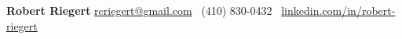 \textbf{Robert Riegert}
\hfill
\href{mailto:rcriegert@gmail.com}{rcriegert@gmail.com} \textbar\ (410) 830-0432 \textbar\ \href{https://www.linkedin.com/in/robert-riegert/}{linkedin.com/in/robert-riegert}
\\
